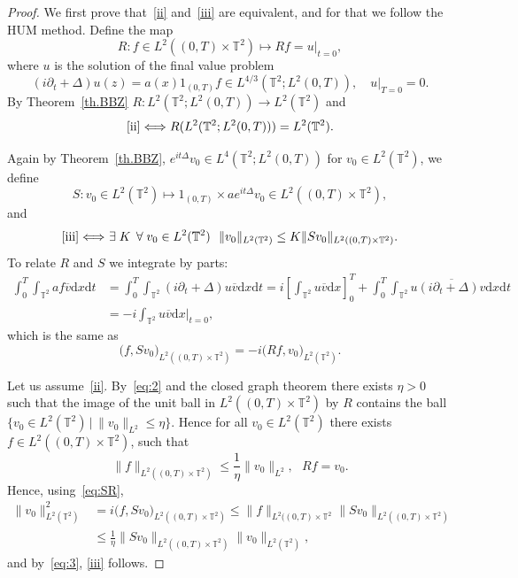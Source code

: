 \documentclass[10pt]{amsart}
\theoremstyle{definition}\newtheorem{defi}[theo]{Definition}\newtheorem{rema}[theo]{Remark}\newtheorem{exam}[theo]{Example}\newtheorem{exem}[theo]{Example}\newtheorem{nota}[theo]{Notation}
\newcommand{\TT}{{\mathbb T}}
\newcommand*{\dd}{\mathrm{d}}
\newcommand*{\dx}{\dd x}
\newcommand*{\dt}{\dd t}
\let\oldexists\exists
\renewcommand*{\exists}{\mathrel{\oldexists}}
\let\oldforall\forall
\renewcommand*{\forall}{\mathrel{\oldforall}}
\newcommand*{\tq}{\,|\,}
\begin{document}
\begin{proof}
We first prove that~\eqref{ii} and~\eqref{iii} are equivalent, and for that we follow the HUM method. Define the map
\[
R: f \in L^2((0,T) \times \TT^2) \mapsto R f = u |_{t=0},
\]
where $u$ is the solution of the final value problem
\[
(i \partial_t + \Delta) u (z) = a(x) 1_{(0,T)}f \in L^{4/3}(\TT^2; L^2(0,T)), \quad u |_{T=0} =0.
\]
By Theorem~\ref{th.BBZ} $ R : L^{2}(\TT^2; L^2(0,T)) \to L^2 (\TT^2) $ and
\begin{equation}\label{eq:2}
\eqref{ii}\Longleftrightarrow R (L^{2}(\TT^2; L^2(0,T))) = L^2 (\TT^2).
\end{equation}

Again by Theorem~\ref{th.BBZ}, $e^{it \Delta} v_0 \in L^4(\TT^2; L^2(0,T)) $ for $ v_0 \in L^2 (\TT^2) $, we define
\[
S: v_0 \in L^2(\TT^2) \mapsto 1_{(0,T)} \times a e^{it \Delta} v_0 \in L^2((0,T) \times \TT^2),
\]
and
\begin{equation}\label{eq:3}
\eqref{iii}\Longleftrightarrow \ \exists K \, \forall v_0 \in L^2 (\TT^2) \ \
\| v_0 \|_{L^2 (\TT^2) } \leq K\| S v_0 \|_{L^2 ((0, T) \times \TT^2)}.
\end{equation}
To relate $ R $ and $ S $ we integrate by parts:
\[
\begin{split}
\int_0^T \!\!\int_{\TT^2} af \overline {v} \dx \dt &= \int_0^T \!\!\int_{\TT^2} (i \partial_t + \Delta) u \overline {v} \dx \dt = i \left[\int_{\TT^2} u \overline{v} \dx \right] _0 ^T +\int_0^T \!\!\int_{\TT^2} u \overline {(i \partial_t + \Delta)v} \dx \dt
\\ & = -i \int_{\TT^2} u \overline{v} \dx|_{t=0},
\end{split}
\]
which is the same as
\begin{equation}\label{eq:SR}
\bigl(f, Sv_0\bigr)_{L^2((0,T)\times \TT^2)} = -i \bigl(Rf, v_0\bigr)_{L^2(\TT^2)}.
\end{equation}

Let us assume~\eqref{ii}. By~\eqref{eq:2} and the closed graph theorem there exists $\eta>0$ such that the image of the unit ball in $L^2((0,T) \times \TT^2)$ by $R$ contains the ball $ \{ v_0 \in L^2 (\TT^2) \tq \| v_0 \|_{L^2} \leq \eta \} $. Hence for all $ v_0 \in L^2 (\TT^2) $ there exists $ f \in L^2((0,T) \times \TT^2)$, such that
\[
\| f \|_{ L^2 ((0,T) \times \TT^2) } \leq \frac 1 \eta \| v_0\|_{ L^2}, \ \ \ R f = v_0.
\]
Hence, using~\eqref{eq:SR},
\begin{equation}
\begin{split}
\| v_0 \| _{L^2(\TT^2)}^2 & = i \bigl(f, Sv_0\bigr)_{L^2((0,T)\times \TT^2)} \leq \| f\|_{L^2((0,T)\times \TT^2} \| Sv_0 \|_{L^2((0,T)\times \TT^2)}
\\
& \leq \frac 1 \eta \| Sv_0 \|_{L^2((0,T)\times \TT^2)}
\| v_0 \| _{L^2(\TT^2)},
\end{split}
\end{equation}
and by~\eqref{eq:3}, {\eqref{iii}} follows.


\end{proof}
\end{document}
